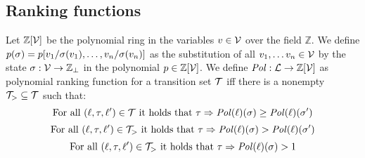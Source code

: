 \subsection{Ranking functions}

\begin{definition} 
	Let $\mathbb{Z}[\mathcal{V}]$ be the polynomial ring in the variables $v \in \mathcal{V}$ over the field $\mathbb{Z}$.
	We define $p(\sigma) = p[v_1/\sigma(v_1), \dots, v_n/\sigma(v_n)]$ as the substitution of all $v_1, \dots v_n \in \mathcal{V}$ by the state $\sigma: \mathcal{V} \rightarrow \mathbb{Z}_\bot$ in the polynomial $p \in \mathbb{Z}[\mathcal{V}]$.
	We define $\mathit{Pol}: \mathcal{L} \rightarrow \mathbb{Z}[\mathcal{V}]$ as polynomial ranking function for a transition set $\mathcal{T}$ iff there is a nonempty $\mathcal{T}_{>} \subseteq \mathcal{T}$ such that:
	\[ \text{For all } (\ell, \tau, \ell') \in \mathcal{T} \text{ it holds that } \tau \Rightarrow \mathit{Pol}(\ell)(\sigma) \geq \mathit{Pol}(\ell)(\sigma') \]
	\[ \text{For all } (\ell, \tau, \ell') \in \mathcal{T}_{>} \text{ it holds that } \tau \Rightarrow \mathit{Pol}(\ell)(\sigma) > \mathit{Pol}(\ell)(\sigma') \]
	\[ \text{For all } (\ell, \tau, \ell') \in \mathcal{T}_{>} \text{ it holds that } \tau \Rightarrow \mathit{Pol}(\ell)(\sigma) > 1 \]
\end{definition}
